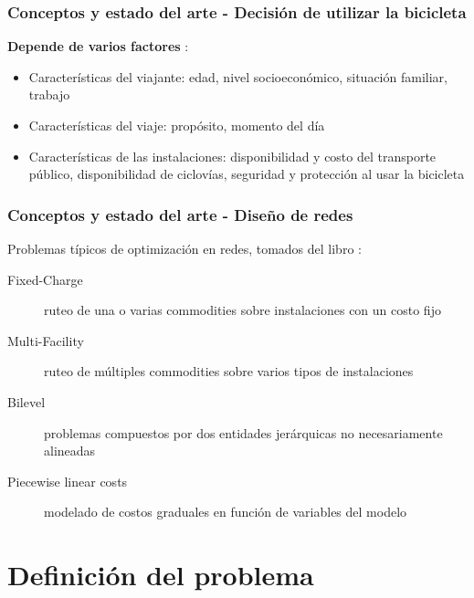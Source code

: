 \documentclass[aspectratio=43, 10pt]{beamer}
\begin{document}

\begin{frame}
    \frametitle{Conceptos y estado del arte - Decisión de utilizar la bicicleta}

    \textbf{Depende de varios factores} \parencite{ortuz2011}:

    \begin{itemize}
        \item{Características del viajante: edad, nivel socioeconómico, situación familiar, trabajo}
        \item{Características del viaje: propósito, momento del día}
        \item{Características de las instalaciones: disponibilidad y costo del transporte público, disponibilidad de ciclovías, seguridad y protección al usar la bicicleta}
    \end{itemize}
\end{frame}

\begin{frame}
    \frametitle{Conceptos y estado del arte - Diseño de redes}

    Problemas típicos de optimización en redes, tomados del libro \textcite{crainic2021}:

    \begin{description}
        \item[Fixed-Charge] ruteo de una o varias commodities sobre instalaciones con un costo fijo
        \item[Multi-Facility] ruteo de múltiples commodities sobre varios tipos de instalaciones
        \item[Bilevel] problemas compuestos por dos entidades jerárquicas no necesariamente alineadas
        \item[Piecewise linear costs] modelado de costos graduales en función de variables del modelo
    \end{description}
\end{frame}

\section{Definición del problema}
\end{document}
